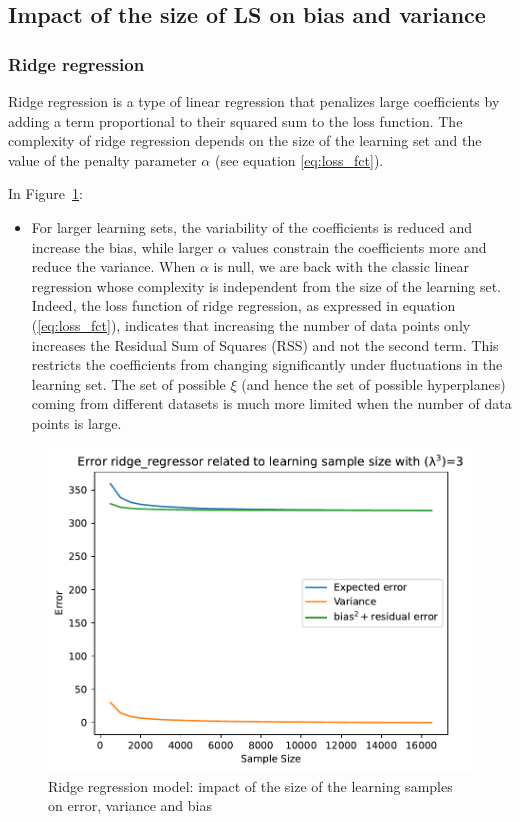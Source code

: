 \documentclass[12pt,titlepage]{article}
\begin{document}
\subsection{Impact of the size of LS on bias and variance}

\subsubsection{Ridge regression}

Ridge regression is a type of linear regression that penalizes large coefficients by adding a term proportional to their squared sum to the loss function. The complexity of ridge regression depends on the size of the learning set and the value of the penalty parameter $\alpha$ (see equation \ref{eq:loss_fct}).

In Figure~\ref{fig:ls_ridge}:
\begin{itemize}
    \item 
    For larger learning sets, the variability of the coefficients is reduced and increase the bias, while larger $\alpha$ values constrain the coefficients more and reduce the variance.
    When $\alpha$ is null, we are back with the classic linear regression whose complexity is independent from the size of the learning set. \\
    Indeed, the loss function of ridge regression, as expressed in equation (\ref{eq:loss_fct}), indicates that increasing the number of data points only increases the Residual Sum of Squares (RSS) and not the second term. This restricts the coefficients from changing significantly under fluctuations in the learning set. The set of possible $\xi$ (and hence the set of possible hyperplanes) coming from different datasets is much more limited when the number of data points is large.
\end{itemize}

\begin{figure}[H]
    \centering
    \includegraphics[scale = 0.6]{image/2.4_ridge_regressor_3-500-17000-500.pdf}
    \caption{Ridge regression model: impact of the size of the learning samples on error, variance and bias}
    \label{fig:ls_ridge}
\end{figure}
\end{document}
